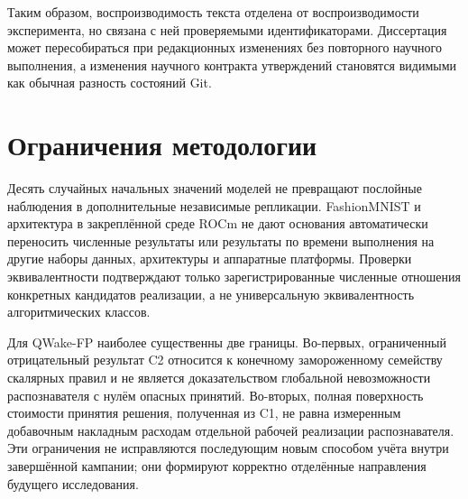 Таким образом, воспроизводимость текста отделена от воспроизводимости
эксперимента, но связана с ней проверяемыми идентификаторами. Диссертация может
пересобираться при редакционных изменениях без повторного научного выполнения,
а изменения научного контракта утверждений становятся видимыми как обычная
разность состояний Git.

\section{Ограничения методологии}
\label{sec:method-limitations}

Десять случайных начальных значений моделей не превращают послойные наблюдения
в дополнительные независимые репликации. FashionMNIST и архитектура
 в закреплённой среде ROCm не дают основания автоматически
переносить численные результаты или результаты по времени выполнения на другие
наборы данных, архитектуры и аппаратные платформы. Проверки эквивалентности
подтверждают только зарегистрированные численные отношения конкретных
кандидатов реализации, а не универсальную эквивалентность алгоритмических
классов.

Для QWake-FP наиболее существенны две границы. Во-первых, ограниченный
отрицательный результат C2 относится к конечному замороженному семейству
скалярных правил и не является доказательством глобальной невозможности
распознавателя с нулём опасных принятий. Во-вторых, полная поверхность
стоимости принятия решения, полученная из C1, не равна измеренным добавочным накладным расходам
отдельной рабочей реализации распознавателя. Эти ограничения не исправляются
последующим новым способом учёта внутри завершённой кампании; они формируют
корректно отделённые направления будущего исследования.
